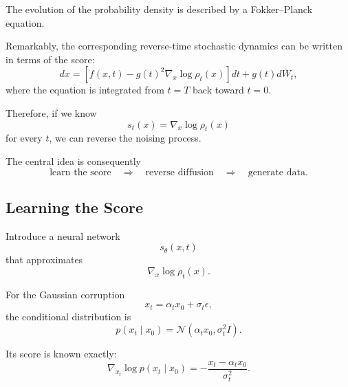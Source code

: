 The evolution of the probability density is described by a Fokker--Planck
equation.

Remarkably, the corresponding reverse-time stochastic dynamics can be written
in terms of the score:
\begin{equation}
    dx
    =
    \left[
        f(x,t)
        -
        g(t)^2
        \nabla_x\log\rho_t(x)
    \right]dt
    +
    g(t)d\overline W_t,
\end{equation}
where the equation is integrated from $t=T$ back toward $t=0$.

Therefore, if we know
\begin{equation}
    s_t(x)
    =
    \nabla_x\log\rho_t(x)
\end{equation}
for every $t$, we can reverse the noising process.

The central idea is consequently
\begin{equation}
    \boxed{
    \text{learn the score}
    \quad\Longrightarrow\quad
    \text{reverse diffusion}
    \quad\Longrightarrow\quad
    \text{generate data}.
    }
\end{equation}


\subsection{Learning the Score}

Introduce a neural network
\begin{equation}
    s_\theta(x,t)
\end{equation}
that approximates
\begin{equation}
    \nabla_x\log\rho_t(x).
\end{equation}

For the Gaussian corruption
\begin{equation}
    x_t
    =
    \alpha_t x_0
    +
    \sigma_t\epsilon,
\end{equation}
the conditional distribution is
\begin{equation}
    p(x_t\mid x_0)
    =
    \mathcal N(
        \alpha_t x_0,
        \sigma_t^2 I
    ).
\end{equation}

Its score is known exactly:
\begin{equation}
    \nabla_{x_t}
    \log p(x_t\mid x_0)
    =
    -
    \frac{
        x_t-\alpha_t x_0
    }{
        \sigma_t^2
    }.
\end{equation}

